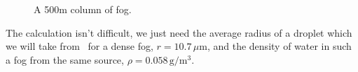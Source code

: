 \begin{figure}[h]
  \caption{A 500m column of fog.}
  \label{fig:column-fog}
\end{figure}
The calculation isn't difficult, we just need the average radius of a
droplet which we will take from~\cite{hess_optical_1998} for a dense
fog, $r = 10.7\,\mu\text{m}$, and the density of water in such a fog from
the same source, $\rho = 0.058\,\text{g}/\text{m}^3$. 












